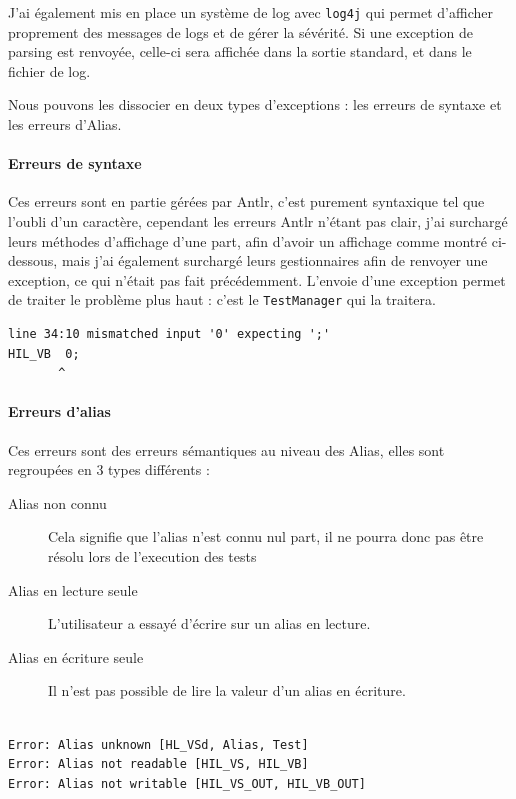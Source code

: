 J'ai également mis en place un système de log avec \texttt{log4j} qui permet d'afficher proprement des messages de logs et de gérer la sévérité. Si une exception de parsing est renvoyée, celle-ci sera affichée dans la sortie standard, et dans le fichier de log.

Nous pouvons les dissocier en deux types d'exceptions : les erreurs de syntaxe et les erreurs d'Alias. 
\paragraph{Erreurs de syntaxe} Ces erreurs sont en partie gérées par Antlr, c'est purement syntaxique tel que l'oubli d'un caractère, cependant les erreurs Antlr n'étant pas clair, j'ai surchargé leurs méthodes d'affichage d'une part, afin d'avoir un affichage comme montré ci-dessous, mais j'ai également surchargé leurs gestionnaires afin de renvoyer une exception, ce qui n'était pas fait précédemment. L'envoie d'une exception permet de traiter le problème plus haut : c'est le \texttt{TestManager} qui la traitera.
\begin{lstlisting}[caption=Affichage d'une erreur de syntaxe, numbers=none]
line 34:10 mismatched input '0' expecting ';'
HIL_VB  0;
       ^
\end{lstlisting}


\paragraph{Erreurs d'alias} Ces erreurs sont des erreurs sémantiques au niveau des Alias, elles sont regroupées en 3 types différents : 
\begin{description}
	\item[Alias non connu] Cela signifie que l'alias n'est connu nul part, il ne pourra donc pas être résolu lors de l'execution des tests
	\item[Alias en lecture seule] L'utilisateur a essayé d'écrire sur un alias en lecture.
	\item[Alias en écriture seule] Il n'est pas possible de lire la valeur d'un alias en écriture.\\~
\end{description}

\begin{lstlisting}[caption=Affichage d'une erreur d'alias, numbers=none]
Error: Alias unknown [HL_VSd, Alias, Test]
Error: Alias not readable [HIL_VS, HIL_VB]
Error: Alias not writable [HIL_VS_OUT, HIL_VB_OUT]
\end{lstlisting}
		
